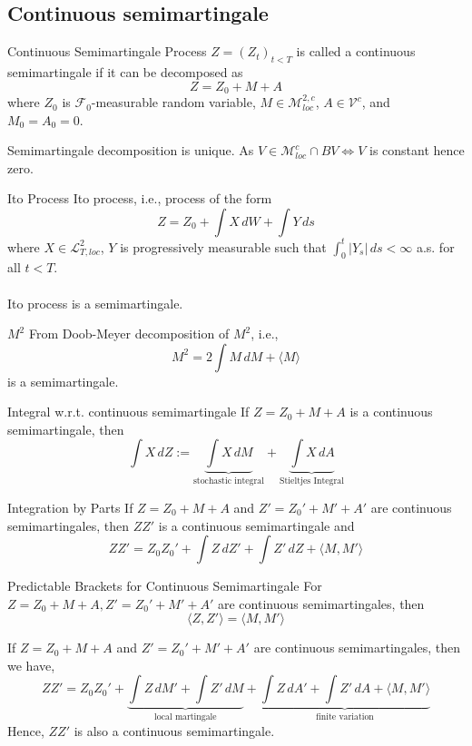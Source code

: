 \documentclass[12pt,a4paper]{article}
\begin{document}
\subsection{Continuous semimartingale}
\begin{definition}{Continuous Semimartingale}{}
    Process $Z = (Z_t)_{t<T}$ is called a continuous semimartingale if it can be decomposed as 
    $$
    Z = Z_0 + M + A
    $$
    where $Z_0$ is $\mathscr{F}_0$-measurable random variable, $M\in\mathcal{M}^{2,c}_{loc}$, $A\in\mathcal{V}^c$, and $M_0=A_0=0$.
\end{definition}
\begin{remark}{}{}
    Semimartingale decomposition is unique. As $V\in\mathcal{M}^c_{loc}\cap BV\iff V$ is constant hence zero.
\end{remark}
\begin{example}{Ito Process}{}
    Ito process, i.e., process of the form
    $$
    Z = Z_0 + \int X\, dW + \int Y\, ds
    $$
    where $X\in\mathcal{L}^2_{T,loc}$, $Y$ is progressively measurable such that $\int_0^t |Y_s|\, ds<\infty$ a.s. for all $t<T$.\\
    \\
    Ito process is a semimartingale.
\end{example}
\begin{example}{$M^2$}{}
    From Doob-Meyer decomposition of $M^2$, i.e.,
    $$
    M^2 = 2\int M\, dM + \langle M\rangle
    $$
    is a semimartingale.
\end{example}
\begin{definition}{Integral w.r.t. continuous semimartingale}{}
    If $Z = Z_0 + M + A$ is a continuous semimartingale, then
    $$
    \int X\, dZ:= \underbrace{\int X\, dM}_{\text{stochastic integral}} + \underbrace{\int X\, dA}_{\text{Stieltjes Integral}}
    $$
\end{definition}
\pagebreak
\begin{theorem}{Integration by Parts}{}
    If $Z= Z_0 + M +A$ and $Z' = Z_0' + M' + A'$ are continuous semimartingales, then $ZZ'$ is a continuous semimartingale and
    $$
    ZZ' = Z_0Z_0' + \int Z\, dZ' + \int Z'\, dZ + \langle M, M'\rangle
    $$
\end{theorem}
\begin{definition}{Predictable Brackets for Continuous Semimartingale}{}
    For $Z= Z_0 + M + A, Z' = Z_0' + M'+A'$ are continuous semimartingales, then
    $$
    \langle Z,Z'\rangle = \langle M,M'\rangle
    $$
\end{definition}
\begin{remark}{}{}
     If $Z= Z_0 + M +A$ and $Z' = Z_0' + M' + A'$ are continuous semimartingales, then we have,
     $$
     ZZ' = Z_0 Z_0' + \underbrace{\int Z\,dM' + \int Z'\,dM}_{\text{local martingale}} + \underbrace{\int Z\,dA' + \int Z'\, dA + \langle M,M'\rangle}_{\text{finite variation}}
     $$
     Hence, $ZZ'$ is also a continuous semimartingale.
\end{remark}
\pagebreak
\end{document}
